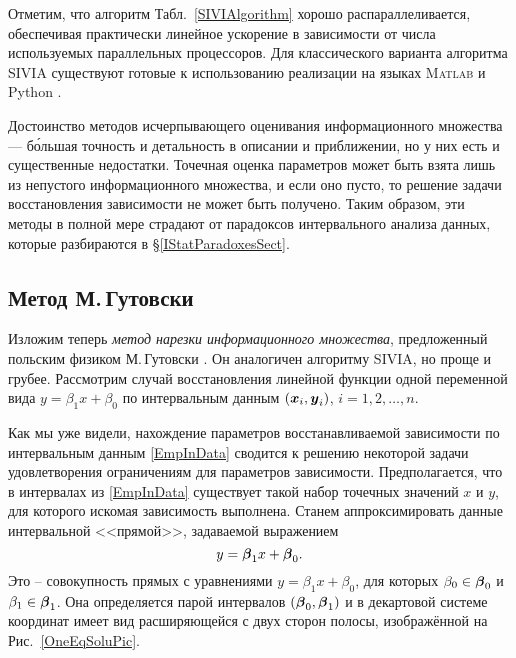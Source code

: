 \documentclass[a5paper,openany]{book}
\newcommand{\mbf}[1]{\protect\text{\boldmath$#1$}}
\begin{document}
Отметим, что алгоритм Табл.~\ref{SIVIAlgorithm} хорошо распараллеливается, обеспечивая 
практически линейное ускорение в зависимости от числа используемых параллельных 
процессоров.  Для  классического  варианта  алгоритма  SIVIA  существуют  готовые 
к использованию реализации на языках \textsc{Matlab} \cite{SIVIAMatlab} и Python  
\cite{SIVIAPython}. 
  
Достоинство методов исчерпывающего оценивания информационного множества --- б\'{о}льшая 
точность и детальность в описании и приближении, но у них есть и существенные недостатки. 
Точечная оценка параметров может быть взята лишь из непустого информационного множества, 
и если оно пусто, то решение задачи восстановления зависимости не может быть получено. 
Таким образом, эти методы в полной мере страдают от парадоксов интервального анализа 
данных, которые разбираются в \S\ref{IStatParadoxesSect}. 
  
  
\subsection{Метод М.\,Гутовски} 
\label{GutowskiMethSect} 
  
Изложим теперь \emph{метод нарезки информационного множества}, предложенный польским 
физиком М.\,Гутовски \cite{Gutowski}. 
Он аналогичен алгоритму SIVIA, но проще и грубее. Рассмотрим случай восстановления 
линейной функции одной переменной вида $y = \beta_{1}x + \beta_{0}$ по интервальным 
данным $(\mbf{x}_{i}, \mbf{y}_{i})$, $i = 1,2,\ldots,n$. 
  
Как мы уже видели, нахождение параметров восстанавливаемой зависимости по интервальным 
данным \eqref{EmpInData} сводится к решению некоторой задачи удовлетворения ограничениям 
для параметров зависимости. Предполагается, что в интервалах из \eqref{EmpInData} 
существует такой набор точечных значений $x$ и $y$, для которого искомая зависимость 
выполнена. Станем аппроксимировать данные интервальной <<прямой>>, задаваемой выражением 
\begin{equation*} 
y = \mbf{\beta}_{1}x + \mbf{\beta}_{0}. 
\end{equation*} 
Это -- совокупность прямых с уравнениями $y = \beta_{1}x + \beta_{0}$, для которых 
$\beta_{0}\in\mbf{\beta}_0$ и $\beta_{1}\in\mbf{\beta}_1$. Она определяется парой 
интервалов $(\mbf{\beta}_{0}, \mbf{\beta}_{1})$ и в декартовой системе координат 
имеет вид расширяющейся с двух сторон полосы, изображённой на Рис.~\ref{OneEqSoluPic}. 
  
\end{document}
